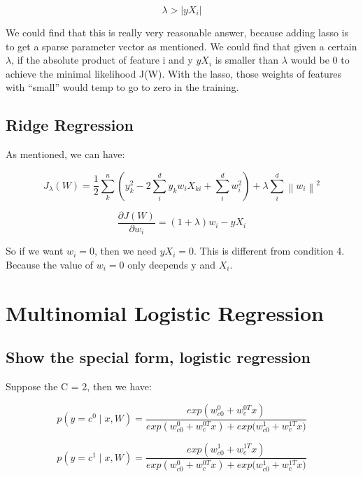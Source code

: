 \documentclass{article} %
\newcommand{\norm}[1]{\left\lVert #1 \right\rVert}
\newcommand{\abs}[1]{\left\lvert #1 \right\rvert}
\begin{document}
\begin{equation}
\lambda > \abs{yX_i}
\end{equation}

We could find that this is really very reasonable answer, because adding lasso
is to get a sparse parameter vector as mentioned. We could find that given a
certain $\lambda$, if the absolute product of feature i and y $yX_i$ is smaller
than $\lambda$ would be 0 to achieve the minimal likelihood J(W). With the
lasso, those weights of features with ``small'' would temp to go to zero in the
training.


\subsection{Ridge Regression}
As mentioned, we can have:

\begin{equation}
J_{\lambda} (W)= \frac{1}{2} \sum_k^n (y_k^2 - 2 \sum_i^d y_k w_i X_{ki} + \sum_i^d w_i^2)
+ \lambda \sum_i^d \norm{w_i}^2
\end{equation}

\begin{equation}
\frac{\partial J(W)}{\partial w_i} = (1+\lambda) w_i - yX_i
\end{equation}

So if we want $w_i = 0$, then we need $yX_i = 0$. This is different from
condition 4. Because the value of $w_i = 0$ only deepends y and $X_i$.


\section{Multinomial Logistic Regression}

\subsection{Show the special form, logistic regression}
Suppose the C = 2, then we have:

\begin{equation}
p(y=c^0 \mid x, W) = \frac{exp(w_{c0}^0 + w_{c}^{0T} x)}
{exp(w_{c0}^0 + w_{c}^{0T} x) + {exp(w_{c0}^1 + w_{c}^{1T} x})}
\end{equation}

\begin{equation}
p(y=c^1 \mid x, W) = \frac{exp(w_{c0}^1 + w_{c}^{1T} x)}
{exp(w_{c0}^0 + w_{c}^{0T} x) + {exp(w_{c0}^1 + w_{c}^{1T} x})}
\end{equation}
\end{document}
